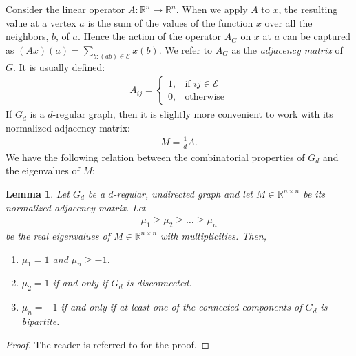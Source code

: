 \documentclass{amsart}
\newtheorem{lemma}{Lemma}
\theoremstyle{definition}
\theoremstyle{remark}
\numberwithin{equation}{section}
\def\R{\mathbb{R}}
\begin{document}
Consider the linear operator $A:\mathbb{R}^n \rightarrow \mathbb{R}^n$. When we apply $A$ to $x$, the resulting value at a vertex $a$ is the sum of the values of the function $x$ over all the neighbors, $b$, of $a$.  Hence the action of the operator $A_G$ on $x$ at $a$ can be captured as $(A x)(a) = \sum_{b:(ab) \in \mathcal{E}} x(b)$. We refer to $A_G$ as the \textit{adjacency matrix} of $G$. It is usually defined: 
\begin{align*}
 A_{ij}= 
\begin{cases}
    1,              & \text{if } ij\in \mathcal{E}\\
    0,              & \text{otherwise}
\end{cases}
\end{align*}
If $G_d$ is a $d$-regular graph, then it is slightly more convenient to work with its normalized adjacency matrix:
\begin{align*}
M = \frac{1}{d}A.
\end{align*}
We have the following relation between the combinatorial properties of $G_d$ and the eigenvalues of $M$:
\begin{lemma} \label{lem:eigA}
Let $G_d$ be a $d$-regular, undirected graph and let $M \in \R^{n \times n}$ be its normalized adjacency matrix. Let 
\begin{align*}
\mu_1 \geq \mu_2 \geq \ldots \geq \mu_n
\end{align*}
be the real eigenvalues of $M \in \R^{n \times n}$ with multiplicities. Then, 
\begin{enumerate}
\item $\mu_1 = 1$ and $\mu_n \geq -1$.
\item $\mu_2 = 1$ if and only if $G_d$ is disconnected.
\item $\mu_n = -1$ if and only if at least one of the connected components of $G_d$ is bipartite.
\end{enumerate}
\end{lemma}
\begin{proof}
The reader is referred to \cite{Dies} for the proof.
\end{proof}
\end{document}
